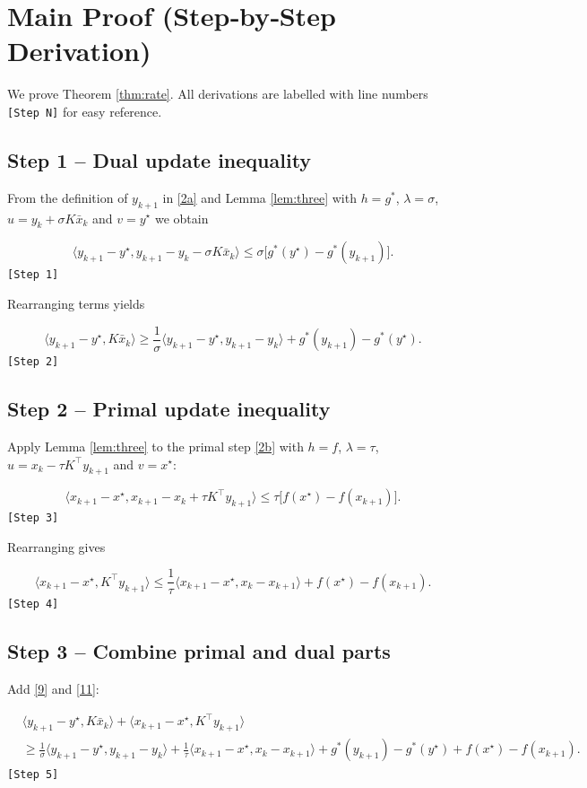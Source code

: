 \documentclass{article}
\newcommand{\inner}[2]{\langle #1,#2\rangle}
\begin{document}
\section*{Main Proof (Step‑by‑Step Derivation)}
We prove Theorem \ref{thm:rate}.  
All derivations are labelled with line numbers \texttt{[Step N]} for easy reference.

\subsection*{Step 1 – Dual update inequality}
From the definition of $y_{k+1}$ in \eqref{2a} and Lemma \ref{lem:three} with $h=g^{*}$, $\lambda=\sigma$, $u=y_{k}+\sigma K\bar x_{k}$ and $v=y^{\star}$ we obtain  

\[
\inner{y_{k+1}-y^{\star}}{y_{k+1}-y_{k}-\sigma K\bar x_{k}}
\le
\sigma\bigl[g^{*}(y^{\star})-g^{*}(y_{k+1})\bigr].
\tag{8}
\] 
\texttt{[Step 1]}

Rearranging terms yields  

\[
\inner{y_{k+1}-y^{\star}}{K\bar x_{k}}
\ge
\frac{1}{\sigma}\inner{y_{k+1}-y^{\star}}{y_{k+1}-y_{k}}
   +g^{*}(y_{k+1})-g^{*}(y^{\star}).
\tag{9}
\] 
\texttt{[Step 2]}

\subsection*{Step 2 – Primal update inequality}
Apply Lemma \ref{lem:three} to the primal step \eqref{2b} with $h=f$, $\lambda=\tau$, $u=x_{k}-\tau K^{\top}y_{k+1}$ and $v=x^{\star}$:

\[
\inner{x_{k+1}-x^{\star}}{x_{k+1}-x_{k}+\tau K^{\top}y_{k+1}}
\le
\tau\bigl[f(x^{\star})-f(x_{k+1})\bigr].
\tag{10}
\] 
\texttt{[Step 3]}

Rearranging gives  

\[
\inner{x_{k+1}-x^{\star}}{K^{\top}y_{k+1}}
\le
\frac{1}{\tau}\inner{x_{k+1}-x^{\star}}{x_{k}-x_{k+1}}
   +f(x^{\star})-f(x_{k+1}).
\tag{11}
\] 
\texttt{[Step 4]}

\subsection*{Step 3 – Combine primal and dual parts}
Add \eqref{9} and \eqref{11}:

\[
\begin{aligned}
&\inner{y_{k+1}-y^{\star}}{K\bar x_{k}}+\inner{x_{k+1}-x^{\star}}{K^{\top}y_{k+1}}
\\[2pt]
&\ge
\frac{1}{\sigma}\inner{y_{k+1}-y^{\star}}{y_{k+1}-y_{k}}
   +\frac{1}{\tau}\inner{x_{k+1}-x^{\star}}{x_{k}-x_{k+1}}
   +g^{*}(y_{k+1})-g^{*}(y^{\star})
   +f(x^{\star})-f(x_{k+1}).
\end{aligned}
\tag{12}
\] 
\texttt{[Step 5]}
\end{document}
